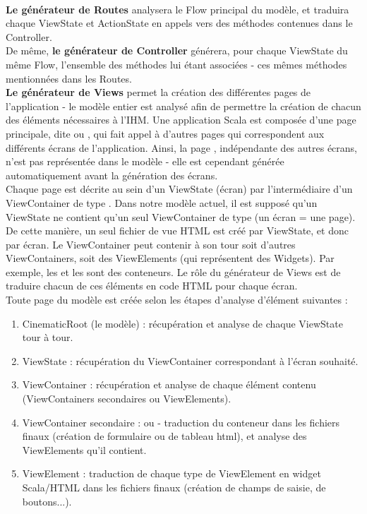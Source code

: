 \\
\textbf{Le générateur de Routes} analysera le Flow principal du modèle, et traduira chaque ViewState et ActionState en appels vers des méthodes contenues dans le Controller.
\\
De même, \textbf{le générateur de Controller} générera, pour chaque ViewState du même Flow, l'ensemble des méthodes lui étant associées - ces mêmes méthodes mentionnées dans les Routes.
\\
\textbf{Le générateur de Views} permet la création des différentes pages de l'application - le modèle entier est analysé afin de permettre la création de chacun des éléments nécessaires à l'IHM. Une application Scala est composée d'une page principale, dite  ou , qui fait appel à d'autres pages qui correspondent aux différents écrans de l'application. Ainsi, la page , indépendante des autres écrans, n'est pas représentée dans le modèle - elle est cependant générée automatiquement avant la génération des écrans.
\\
Chaque page est décrite au sein d'un ViewState (écran) par l'intermédiaire d'un ViewContainer de type . Dans notre modèle actuel, il est supposé qu'un ViewState ne contient qu'un seul ViewContainer de type  (un écran = une page). De cette manière, un seul fichier de vue HTML est créé par ViewState, et donc par écran. Le ViewContainer  peut contenir à son tour soit d'autres ViewContainers, soit des ViewElements (qui représentent des Widgets). Par exemple, les  et les  sont des conteneurs. Le rôle du générateur de Views est de traduire chacun de ces éléments en code HTML pour chaque écran.
\\
Toute page du modèle est créée selon les étapes d'analyse d'élément suivantes :
\begin{enumerate}
\item CinematicRoot (le modèle) : récupération et analyse de chaque ViewState tour à tour.
\item ViewState : récupération du ViewContainer  correspondant à l'écran souhaité.
\item ViewContainer : récupération et analyse de chaque élément contenu (ViewContainers secondaires ou ViewElements).
\item ViewContainer secondaire :  ou  - traduction du conteneur dans les fichiers finaux (création de formulaire ou de tableau html), et analyse des ViewElements qu'il contient.
\item ViewElement : traduction de chaque type de ViewElement en widget Scala/HTML dans les fichiers finaux (création de champs de saisie, de boutons...).
\end{enumerate}

